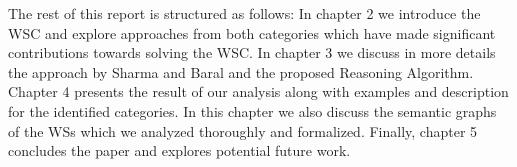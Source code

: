 The rest of this report is structured as follows:
In chapter 2 we introduce the WSC and explore approaches from both categories which have made significant contributions towards solving the WSC. In chapter 3 we discuss in more details the approach by Sharma and Baral \cite{2018CommonsenseKT} and the proposed Reasoning Algorithm.
Chapter 4 presents the result of our analysis along with examples and description for the identified categories. In this chapter we also discuss the semantic graphs of the WSs which we analyzed thoroughly and formalized. Finally, chapter 5 concludes the paper and explores potential future work.


